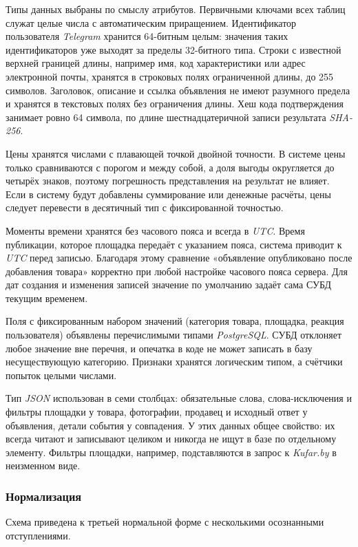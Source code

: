 Типы данных выбраны по смыслу атрибутов. Первичными ключами всех таблиц служат целые числа с автоматическим приращением. Идентификатор пользователя \textit{Telegram} хранится 64-битным целым: значения таких идентификаторов уже выходят за пределы 32-битного типа. Строки с известной верхней границей длины, например имя, код характеристики или адрес электронной почты, хранятся в строковых полях ограниченной длины, до 255 символов. Заголовок, описание и ссылка объявления не имеют разумного предела и хранятся в текстовых полях без ограничения длины. Хеш кода подтверждения занимает ровно 64 символа, по длине шестнадцатеричной записи результата \textit{SHA-256}.

Цены хранятся числами с плавающей точкой двойной точности. В системе цены только сравниваются с порогом и между собой, а доля выгоды округляется до четырёх знаков, поэтому погрешность представления на результат не влияет. Если в систему будут добавлены суммирование или денежные расчёты, цены следует перевести в десятичный тип с фиксированной точностью.

Моменты времени хранятся без часового пояса и всегда в \textit{UTC}. Время публикации, которое площадка передаёт с указанием пояса, система приводит к \textit{UTC} перед записью. Благодаря этому сравнение «объявление опубликовано после добавления товара» корректно при любой настройке часового пояса сервера. Для дат создания и изменения записей значение по умолчанию задаёт сама СУБД текущим временем.

Поля с фиксированным набором значений (категория товара, площадка, реакция пользователя) объявлены перечислимыми типами \textit{PostgreSQL}. СУБД отклоняет любое значение вне перечня, и опечатка в коде не может записать в базу несуществующую категорию. Признаки хранятся логическим типом, а счётчики попыток целыми числами.

Тип \textit{JSON} использован в семи столбцах: обязательные слова, слова-исключения и фильтры площадки у товара, фотографии, продавец и исходный ответ у объявления, детали события у совпадения. У этих данных общее свойство: их всегда читают и записывают целиком и никогда не ищут в базе по отдельному элементу. Фильтры площадки, например, подставляются в запрос к \textit{Kufar.by} в неизменном виде.

\subsubsection{Нормализация}

Схема приведена к третьей нормальной форме с несколькими осознанными отступлениями.

